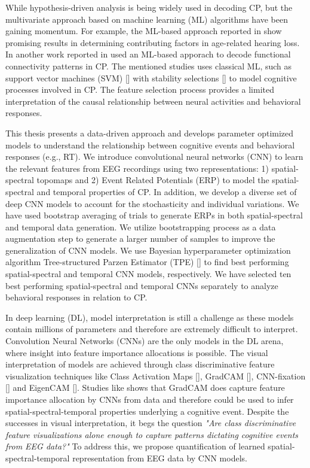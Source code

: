 \documentclass{article}
\begin{document}
While hypothesis-driven analysis is being widely used in decoding CP, but the multivariate approach based on machine learning (ML) algorithms have been gaining momentum. For example, the ML-based approach reported in \cite{Mahmud2019, Mahmud_2} show promising results in determining contributing factors in age-related hearing loss. In another work reported in \cite{Al_Fahad_2020} used an ML-based apporach to decode functional connectivity patterns in CP. The mentioned studies uses classical ML, such as support vector machines (SVM) [\cite{svm}] with stability selections [\cite{stability_selection}] to model cognitive processes involved in CP. The feature selection process provides a limited interpretation of the causal relationship between neural activities and behavioral responses.


This thesis presents a data-driven approach and develops parameter optimized models to understand the relationship between cognitive events and behavioral responses (e.g., RT). We introduce convolutional neural networks (CNN) to learn the relevant features from EEG recordings using two representations: 1) spatial-spectral topomaps and 2) Event Related Potentials (ERP) to model the spatial-spectral and temporal properties of CP. In addition, we develop a diverse set of deep CNN models to account for the stochasticity and individual variations. We have used bootstrap averaging of trials to generate ERPs in both spatial-spectral and temporal data generation. We utilize bootstrapping process as a data augmentation step to generate a larger number of samples to improve the generalization of CNN models. We use Bayesian hyperparameter optimization algorithm Tree-structured Parzen Estimator (TPE) [\cite{TPE_1}] to find best performing spatial-spectral and temporal CNN models, respectively. We have selected ten best performing spatial-spectral and temporal CNNs separately to analyze behavioral responses in relation to CP.


In deep learning (DL), model interpretation is still a challenge as these models contain millions of parameters and therefore are extremely difficult to interpret. Convolution Neural Networks (CNNs) are the only models in the DL arena, where insight into feature importance allocations is possible. The visual interpretation of models are achieved through class discriminative feature visualization techniques like Class Activation Maps [\cite{CAM}], GradCAM [\cite{gradcam}], CNN-fixation [\cite{cnn_fixation}] and EigenCAM [\cite{EigenCAM}]. Studies like \cite{eeg_cnn_gradcam, eeg_cnn_gradcam2, eeg_cnn_gradcam3} shows that GradCAM does capture feature importance allocation by CNNs from data and therefore could be used to infer spatial-spectral-temporal properties underlying a cognitive event. Despite the successes in visual interpretation, it begs the question \emph{"Are class discriminative feature visualizations alone enough to capture patterns dictating cognitive events from EEG data?"} To address this, we propose quantification of learned spatial-spectral-temporal representation from EEG data by CNN models.
\end{document}
